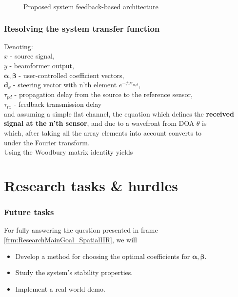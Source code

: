 \documentclass[10pt,pdflatex,headrule,landscape]{beamer}
\newcommand\vecnot[1]{\boldsymbol{#1}}
\begin{document}
\begin{frame}
\begin{minipage}{0.44\textwidth}
\begin{figure}
\caption{Proposed system feedback-based architecture}
\label{fig:SpatialIIRSuggestedArch}
\end{figure}
\end{minipage}
\end{frame}

\begin{frame}[allowframebreaks]
\frametitle{Resolving the system transfer function}
Denoting:\\
$ x $ - source signal,\\
$ y $ - beamformer output,\\
$ \vecnot{\alpha},\vecnot{\beta} $ - user-controlled coefficient vectors,\\
$\vecnot{d}_{\theta}$ - steering vector with n'th element $e^{-j\omega \tau_{n,\theta}}$,\\
$ \tau_{pd} $ - propagation delay from the source to the reference sensor,\\
$ \tau_{tx} $ - feedback transmission delay\\
and assuming a simple flat channel, the equation which defines the \textbf{received signal at the n'th sensor}, and due to a wavefront from DOA $\theta$ is 
$$

$$
which, after taking all the array elements into account converts to
$$

$$
under the Fourier transform.
\\
Using the Woodbury matrix identity \cite{woodbury1950inverting} yields
$$

$$

\end{frame}

\section{Research tasks \& hurdles}

\begin{frame}
\frametitle{Future tasks}
For fully answering the question presented in frame \ref{frm:ResearchMainGoal_SpatialIIR}, we will 
\begin{itemize}
\item
{
Develop a method for choosing the optimal coefficients for $ \vecnot{\alpha},\vecnot{\beta} $.
}
\item
{
Study the system's stability properties.
}
\item
{
Implement a real world demo.
}
\end{itemize}
\end{frame}
\end{document}

